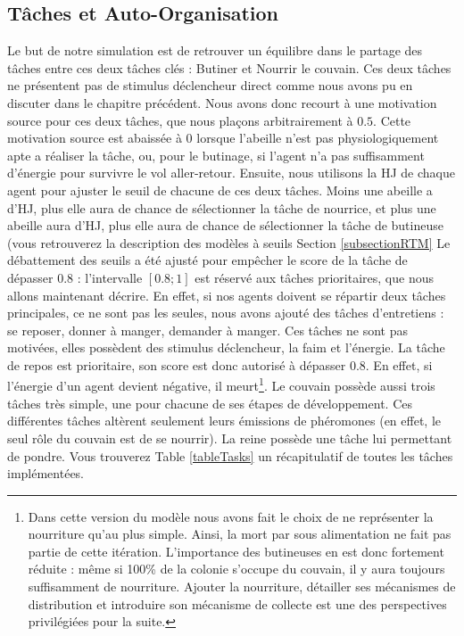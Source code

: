 	\subsection{Tâches et Auto-Organisation}
		Le but de notre simulation est de retrouver un équilibre dans le partage des tâches entre ces deux tâches clés : Butiner et Nourrir le couvain. Ces deux tâches ne présentent pas de stimulus déclencheur direct comme nous avons pu en discuter dans le chapitre précédent. Nous avons donc recourt à une motivation source pour ces deux tâches, que nous plaçons arbitrairement à $0.5$. Cette motivation source est abaissée à 0 lorsque l'abeille n'est pas physiologiquement apte a réaliser la tâche, ou, pour le butinage, si l'agent n'a pas suffisamment d'énergie pour survivre le vol aller-retour. Ensuite, nous utilisons la HJ de chaque agent pour ajuster le seuil de chacune de ces deux tâches. Moins une abeille a d'HJ, plus elle aura de chance de sélectionner la tâche de nourrice, et plus une abeille aura d'HJ, plus elle aura de chance de sélectionner la tâche de butineuse (vous retrouverez la description des modèles à seuils Section \ref{subsectionRTM} Le débattement des seuils a été ajusté pour empêcher le score de la tâche de dépasser $0.8$ : l'intervalle $[0.8 ; 1]$ est réservé aux tâches prioritaires, que nous allons maintenant décrire. En effet, si nos agents doivent se répartir deux tâches principales, ce ne sont pas les seules, nous avons ajouté des tâches d'entretiens : se reposer, donner à manger, demander à manger. Ces tâches ne sont pas motivées, elles possèdent des stimulus déclencheur, la faim et l'énergie. La tâche de repos est prioritaire, son score est donc autorisé à dépasser $0.8$. En effet, si l'énergie d'un agent devient négative, il meurt\footnote{Dans cette version du modèle nous avons fait le choix de ne représenter la nourriture qu'au plus simple. Ainsi, la mort par sous alimentation ne fait pas partie de cette itération. L'importance des butineuses en est donc fortement réduite : même si 100\% de la colonie s'occupe du couvain, il y aura toujours suffisamment de nourriture. Ajouter la nourriture, détailler ses mécanismes de distribution et introduire son mécanisme de collecte est une des perspectives privilégiées pour la suite.}. Le couvain possède aussi trois tâches très simple, une pour chacune de ses étapes de développement. Ces différentes tâches altèrent seulement leurs émissions de phéromones (en effet, le seul rôle du couvain est de se nourrir). La reine possède une tâche lui permettant de pondre. Vous trouverez Table \ref{tableTasks} un récapitulatif de toutes les tâches implémentées.
		
